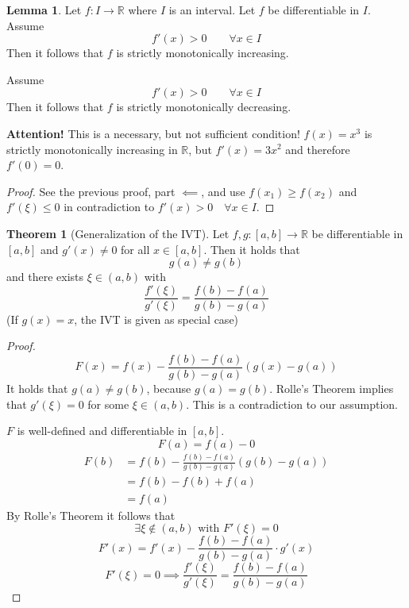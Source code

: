 \documentclass[a4paper,landscape,twocolumn]{article}
\theoremstyle{definition}
\newtheorem{theorem}{Theorem}
\newtheorem{lemma}{Lemma}
\begin{document}
%
\begin{lemma}
  Let $f: I \to \mathbb R$ where $I$ is an interval.
  Let $f$ be differentiable in $I$. Assume
  \[ f'(x) > 0 \qquad \forall x \in I \]
  Then it follows that $f$ is strictly monotonically increasing.

  Assume
  \[ f'(x) > 0 \qquad \forall x \in I \]
  Then it follows that $f$ is strictly monotonically decreasing.

  \textbf{Attention!} This is a necessary, but not sufficient condition!
  $f(x) = x^3$ is strictly monotonically increasing in $\mathbb R$, but
  $f'(x) = 3x^2$ and therefore $f'(0) = 0$.
\end{lemma}
\begin{proof}
  See the previous proof, part $\impliedby$, and use $f(x_1) \geq f(x_2)$
  and $f'(\xi) \leq 0$ in contradiction to $f'(x) > 0 \quad \forall x \in I$.
\end{proof}
%
\begin{theorem}[Generalization of the IVT]
  Let $f, g: [a,b] \to \mathbb R$ be differentiable in $[a,b]$ and $g'(x) \neq 0$
  for all $x \in [a,b]$. Then it holds that
  \[ g(a) \neq g(b) \]
  and there exists $\xi \in (a,b)$ with
  \[ \frac{f'(\xi)}{g'(\xi)} = \frac{f(b) - f(a)}{g(b) - g(a)} \]
  (If $g(x) = x$, the IVT is given as special case)
\end{theorem}
%
\begin{proof}
  \[ F(x) = f(x) - \frac{f(b) - f(a)}{g(b) - g(a)} (g(x) - g(a)) \]
  It holds that $g(a) \neq g(b)$, because $g(a) = g(b)$.
  Rolle's Theorem implies that $g'(\xi) = 0$ for some $\xi \in (a,b)$.
  This is a contradiction to our assumption.

  $F$ is well-defined and differentiable in $[a,b]$.
  \[ F(a) = f(a) - 0 \]
  \begin{align*}
    F(b) &= f(b) - \frac{f(b) - f(a)}{g(b) - g(a)} (g(b) - g(a)) \\
         &= f(b) - f(b) + f(a) \\
         &= f(a)
  \end{align*}
  By Rolle's Theorem it follows that
  \[ \exists \xi \not\in (a, b) \text{ with } F'(\xi) = 0 \]
  \[ F'(x) = f'(x) - \frac{f(b) - f(a)}{g(b) - g(a)} \cdot g'(x) \]
  \[ F'(\xi) = 0 \implies \frac{f'(\xi)}{g'(\xi)} = \frac{f(b) - f(a)}{g(b) - g(a)} \]
\end{proof}
%
\end{document}
